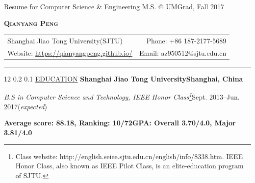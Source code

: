 \documentclass{article}
\begin{document}
\pagestyle{empty}
\newcommand{\cvtitle}[5]{ {\huge\bfseries\scshape #1} \vspace{1em}\\
\begin{tabular*}{\linewidth}{l@{\extracolsep{\fill}}r}
#2 & #4 \\ #3 & #5 \\
\end{tabular*}
\vspace{3pt} \rule{\textwidth}{1.25pt}}

\makeatletter
\renewcommand{\section}{\@startsection {section} {12} {\z@} {0.2\baselineskip} {0.1\baselineskip} {\normalfont\large\scshape\bfseries}}
\makeatother

\newenvironment{entrylist}{%
\begin{tabular*}{\textwidth}{@{\extracolsep{\fill}}ll} 
}{
\end{tabular*} 
}
\newcommand{\entry}[4]{%
#1&\parbox[t]{.8\textwidth}{%
\textbf{#2}%
#3\\%
#4\vspace{\parsep}%
}\\}

\hfill Resume for Computer Science \& Engineering M.S. @ UMGrad, Fall 2017

\cvtitle{Qianyang Peng} %
{Shanghai Jiao Tong University(SJTU)} %
{Website: \href{https://qianyangpeng.github.io/}{https://qianyangpeng.github.io/}} %
{Phone: +86 187-2177-5689} %
{Email: az950512@sjtu.edu.cn} %

\section{\underline{EDUCATION}}
\textbf{Shanghai Jiao Tong University}\hfill\textbf{Shanghai, China}

\emph{B.S in Computer Science and Technology, IEEE Honor Class\footnote{Class website: http://english.seiee.sjtu.edu.cn/english/info/8338.htm. IEEE Honor Class, also known as IEEE Pilot Class, is an elite-education program of SJTU.}}\hfill Sept. 2013--Jun. 2017(\emph{expected})

\textbf{Average score: 88.18, Ranking: 10/72}\quad\textbf{GPA: Overall 3.70/4.0, Major 3.81/4.0}
\vspace{\parsep}
\end{document}
